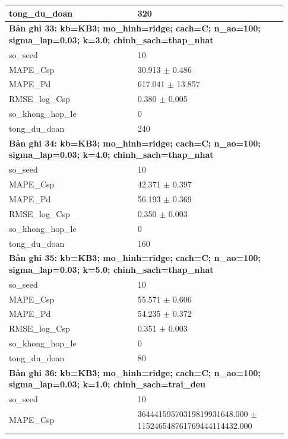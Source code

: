 \begin{longtable}{p{0.43\linewidth}p{0.50\linewidth}}
tong\_\allowbreak du\_\allowbreak doan & 320 \\
\midrule
\multicolumn{2}{p{0.95\linewidth}}{\textbf{Bản ghi 33: kb=KB3; mo\_hinh=ridge; cach=C; n\_ao=100; sigma\_lap=0.03; k=3.0; chinh\_sach=thap\_nhat}} \\
so\_\allowbreak seed & 10 \\
MAPE\_\allowbreak Csp & 30.913 $\pm$ 0.486 \\
MAPE\_\allowbreak Pd & 617.041 $\pm$ 13.857 \\
RMSE\_\allowbreak log\_\allowbreak Csp & 0.380 $\pm$ 0.005 \\
so\_\allowbreak khong\_\allowbreak hop\_\allowbreak le & 0 \\
tong\_\allowbreak du\_\allowbreak doan & 240 \\
\midrule
\multicolumn{2}{p{0.95\linewidth}}{\textbf{Bản ghi 34: kb=KB3; mo\_hinh=ridge; cach=C; n\_ao=100; sigma\_lap=0.03; k=4.0; chinh\_sach=thap\_nhat}} \\
so\_\allowbreak seed & 10 \\
MAPE\_\allowbreak Csp & 42.371 $\pm$ 0.397 \\
MAPE\_\allowbreak Pd & 56.193 $\pm$ 0.369 \\
RMSE\_\allowbreak log\_\allowbreak Csp & 0.350 $\pm$ 0.003 \\
so\_\allowbreak khong\_\allowbreak hop\_\allowbreak le & 0 \\
tong\_\allowbreak du\_\allowbreak doan & 160 \\
\midrule
\multicolumn{2}{p{0.95\linewidth}}{\textbf{Bản ghi 35: kb=KB3; mo\_hinh=ridge; cach=C; n\_ao=100; sigma\_lap=0.03; k=5.0; chinh\_sach=thap\_nhat}} \\
so\_\allowbreak seed & 10 \\
MAPE\_\allowbreak Csp & 55.571 $\pm$ 0.606 \\
MAPE\_\allowbreak Pd & 54.235 $\pm$ 0.372 \\
RMSE\_\allowbreak log\_\allowbreak Csp & 0.351 $\pm$ 0.003 \\
so\_\allowbreak khong\_\allowbreak hop\_\allowbreak le & 0 \\
tong\_\allowbreak du\_\allowbreak doan & 80 \\
\midrule
\multicolumn{2}{p{0.95\linewidth}}{\textbf{Bản ghi 36: kb=KB3; mo\_hinh=ridge; cach=C; n\_ao=100; sigma\_lap=0.03; k=1.0; chinh\_sach=trai\_deu}} \\
so\_\allowbreak seed & 10 \\
MAPE\_\allowbreak Csp & 36444159570319819931648.000 $\pm$ 115246548761769444114432.000 \\

\end{longtable}
